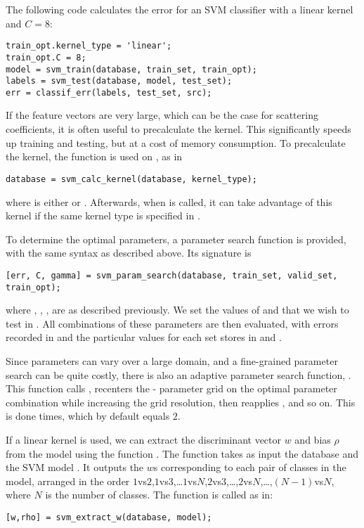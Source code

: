 \documentclass{article}
\begin{document}
The following code calculates the error for an SVM classifier with a linear kernel and $C = 8$:
\begin{lstlisting}
train_opt.kernel_type = 'linear';
train_opt.C = 8;
model = svm_train(database, train_set, train_opt);
labels = svm_test(database, model, test_set);
err = classif_err(labels, test_set, src);
\end{lstlisting}

If the feature vectors are very large, which can be the case for scattering coefficients, it is often useful to precalculate the kernel. This significantly speeds up training and testing, but at a cost of memory consumption. To precalculate the kernel, the function  is used on , as in
\begin{lstlisting}
database = svm_calc_kernel(database, kernel_type);
\end{lstlisting}
where  is either  or . Afterwards, when  is called, it can take advantage of this kernel if the same kernel type is specified in .

To determine the optimal parameters, a parameter search function  is provided, with the same syntax as described above. Its signature is
\begin{lstlisting}
[err, C, gamma] = svm_param_search(database, train_set, valid_set, train_opt);
\end{lstlisting}
where , , ,  are as described previously. We set the values of  and  that we wish to test in . All combinations of these parameters are then evaluated, with errors recorded in  and the particular values for each set stores in  and .

Since parameters can vary over a large domain, and a fine-grained parameter search can be quite costly, there is also an adaptive parameter search function, . This function calls , recenters the - parameter grid on the optimal parameter combination while increasing the grid resolution,  then reapplies , and so on. This is done  times, which by default equals $2$.

If a linear kernel is used, we can extract the discriminant vector $w$ and bias $\rho$ from the model using the function . The function takes as input the database  and the SVM model . It outputs the $w$s corresponding to each pair of classes in the model, arranged in the order $1$vs$2$,$1$vs$3$,\ldots$1$vs$N$,$2$vs$3$,\ldots,$2$vs$N$,\ldots,$(N-1)$vs$N$, where $N$ is the number of classes. The function is called as in:
\begin{lstlisting}
[w,rho] = svm_extract_w(database, model);
\end{lstlisting}
\end{document}
